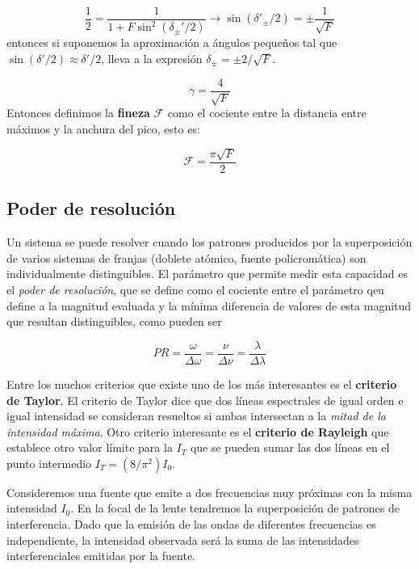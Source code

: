 \documentclass[12pt,a4paper]{book}
\numberwithin{equation}{section}
\numberwithin{figure}{section}
\newcommand{\1}{_{(1)}}
\newcommand{\2}{_{(2)}}
\theoremstyle{definition}
\begin{document}
$$ \frac{1}{2} = \frac{1}{1+F\sin^2(\delta_{\pm}'/2)} \rightarrow \sin (\delta'_\pm/2) = \pm \frac{1}{\sqrt{F}} $$
entonces si suponemos la aproximación a ángulos pequeños tal que $\sin (\delta'/2) \approx \delta'/2$, lleva a la expresión $\delta_{\pm}=\pm2/\sqrt{F}$.

\begin{equation}
\gamma = \frac{4}{\sqrt{F}}
\end{equation}
Entonces definimos la \textbf{fineza} $\mathcal{F}$ como el cociente entre la distancia entre máximos y la anchura del pico, esto es:

\begin{equation}
\mathcal{F} = \frac{\pi \sqrt{F}}{2}
\end{equation}

\subsection{Poder de resolución}

Un sistema se puede resolver cuando los patrones producidos por la superposición de varios sistemas de franjas (doblete atómico, fuente policromática) son individualmente distinguibles. El parámetro que permite medir esta capacidad es el \textit{poder de resolución}, que se define como el cociente entre el parámetro qeu define a la magnitud evaluada y la mínima diferencia de valores de esta magnitud que resultan distinguibles, como pueden ser

\begin{equation}
PR = \frac{\omega}{\Delta \omega} = \frac{\nu}{\Delta \nu} = \frac{\lambda}{\Delta \lambda}
\end{equation}

Entre los muchos criterios que existe uno de los más interesantes es el \textbf{criterio de Taylor}. El criterio de Taylor dice que dos líneas espectrales de igual orden e igual intensidad se consideran resueltos si ambas intersectan a la \textit{mitad de la intensidad máxima}. Otro criterio interesante es el \textbf{criterio de Rayleigh} que establece otro valor límite para la $I_T$ que se pueden sumar las dos líneas en el punto intermedio $I_T=(8/\pi^2)I_0$. \\


\hrulefill

Consideremos una fuente que emite a dos frecuencias muy próximas con la misma intensidad $I_0$. En la focal de la lente tendremos la superposición de patrones de interferencia. Dado que la emisión de las ondas de diferentes frecuencias es independiente, la intensidad observada será la suma de las intensidades interferenciales emitidas por la fuente. 
\end{document}

